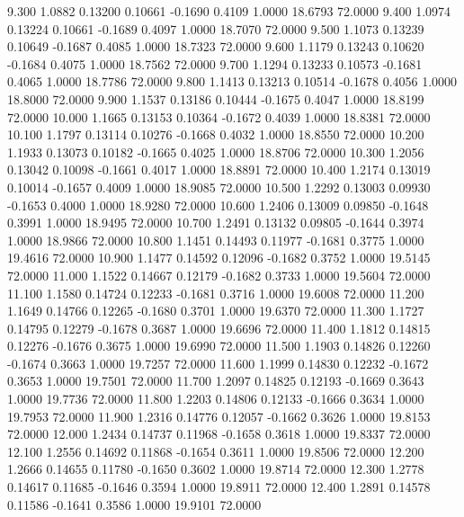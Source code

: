    9.300   1.0882   0.13200   0.10661  -0.1690   0.4109   1.0000  18.6793  72.0000
   9.400   1.0974   0.13224   0.10661  -0.1689   0.4097   1.0000  18.7070  72.0000
   9.500   1.1073   0.13239   0.10649  -0.1687   0.4085   1.0000  18.7323  72.0000
   9.600   1.1179   0.13243   0.10620  -0.1684   0.4075   1.0000  18.7562  72.0000
   9.700   1.1294   0.13233   0.10573  -0.1681   0.4065   1.0000  18.7786  72.0000
   9.800   1.1413   0.13213   0.10514  -0.1678   0.4056   1.0000  18.8000  72.0000
   9.900   1.1537   0.13186   0.10444  -0.1675   0.4047   1.0000  18.8199  72.0000
  10.000   1.1665   0.13153   0.10364  -0.1672   0.4039   1.0000  18.8381  72.0000
  10.100   1.1797   0.13114   0.10276  -0.1668   0.4032   1.0000  18.8550  72.0000
  10.200   1.1933   0.13073   0.10182  -0.1665   0.4025   1.0000  18.8706  72.0000
  10.300   1.2056   0.13042   0.10098  -0.1661   0.4017   1.0000  18.8891  72.0000
  10.400   1.2174   0.13019   0.10014  -0.1657   0.4009   1.0000  18.9085  72.0000
  10.500   1.2292   0.13003   0.09930  -0.1653   0.4000   1.0000  18.9280  72.0000
  10.600   1.2406   0.13009   0.09850  -0.1648   0.3991   1.0000  18.9495  72.0000
  10.700   1.2491   0.13132   0.09805  -0.1644   0.3974   1.0000  18.9866  72.0000
  10.800   1.1451   0.14493   0.11977  -0.1681   0.3775   1.0000  19.4616  72.0000
  10.900   1.1477   0.14592   0.12096  -0.1682   0.3752   1.0000  19.5145  72.0000
  11.000   1.1522   0.14667   0.12179  -0.1682   0.3733   1.0000  19.5604  72.0000
  11.100   1.1580   0.14724   0.12233  -0.1681   0.3716   1.0000  19.6008  72.0000
  11.200   1.1649   0.14766   0.12265  -0.1680   0.3701   1.0000  19.6370  72.0000
  11.300   1.1727   0.14795   0.12279  -0.1678   0.3687   1.0000  19.6696  72.0000
  11.400   1.1812   0.14815   0.12276  -0.1676   0.3675   1.0000  19.6990  72.0000
  11.500   1.1903   0.14826   0.12260  -0.1674   0.3663   1.0000  19.7257  72.0000
  11.600   1.1999   0.14830   0.12232  -0.1672   0.3653   1.0000  19.7501  72.0000
  11.700   1.2097   0.14825   0.12193  -0.1669   0.3643   1.0000  19.7736  72.0000
  11.800   1.2203   0.14806   0.12133  -0.1666   0.3634   1.0000  19.7953  72.0000
  11.900   1.2316   0.14776   0.12057  -0.1662   0.3626   1.0000  19.8153  72.0000
  12.000   1.2434   0.14737   0.11968  -0.1658   0.3618   1.0000  19.8337  72.0000
  12.100   1.2556   0.14692   0.11868  -0.1654   0.3611   1.0000  19.8506  72.0000
  12.200   1.2666   0.14655   0.11780  -0.1650   0.3602   1.0000  19.8714  72.0000
  12.300   1.2778   0.14617   0.11685  -0.1646   0.3594   1.0000  19.8911  72.0000
  12.400   1.2891   0.14578   0.11586  -0.1641   0.3586   1.0000  19.9101  72.0000
